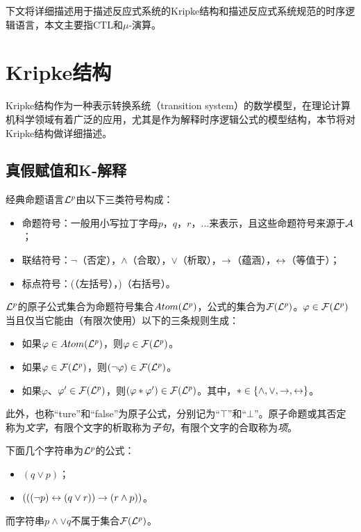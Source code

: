 下文将详细描述用于描述反应式系统的Kripke结构和描述反应式系统规范的时序逻辑语言，本文主要指CTL和$\mu$-演算。

\section{Kripke结构}
Kripke结构作为一种表示转换系统（transition system）的数学模型，在理论计算机科学领域有着广泛的应用，尤其是作为解释时序逻辑公式的模型结构，本节将对Kripke结构做详细描述。

\subsection{真假赋值和K-解释}
经典命题语言${\cal L}^p$由以下三类符号构成：
\begin{itemize}
	\item 命题符号：一般用小写拉丁字母$p$，$q$，$r$，$\dots$来表示，且这些命题符号来源于${\cal A}$；
	\item 联结符号：$\neg$（否定），$\wedge$（合取），$\vee$（析取），$\rightarrow$（蕴涵），$\leftrightarrow$（等值于）；
	\item 标点符号：(（左括号），)（右括号）。
\end{itemize}

${\cal L}^p$的原子公式集合为命题符号集合$Atom({\cal L}^p)$，公式的集合为${\cal F}({\cal L}^p)$。$\varphi\in {\cal F}({\cal L}^p)$当且仅当它能由（有限次使用）以下的三条规则生成\cite{luzhongwan1989}：
\begin{itemize}
	\item 如果$\varphi\in Atom({\cal L}^p)$，则$\varphi \in {\cal F}({\cal L}^p)$。
	\item 如果$\varphi \in {\cal F}({\cal L}^p)$，则$(\neg \varphi)\in {\cal F}({\cal L}^p)$。
	\item 如果$\varphi$、$\varphi'\in {\cal F}({\cal L}^p)$，则$(\varphi * \varphi')\in {\cal F}({\cal L}^p)$。其中，$*\in \{\wedge,\vee, \rightarrow, \leftrightarrow\}$。
\end{itemize}
此外，也称“ture”和“false”为原子公式，分别记为“$\top$”和“$\bot$”。原子命题或其否定称为\emph{文字}，有限个文字的析取称为\emph{子句}，有限个文字的合取称为\emph{项}。

\begin{example}\label{exp:pro:form}
	下面几个字符串为${\cal L}^p$的公式：
	\begin{itemize}
		\item $(q \vee p)$；
		\item $(((\neg p)\leftrightarrow(q\vee r))\rightarrow(r \wedge p))$。
	\end{itemize}
	而字符串$p\wedge \vee q$不属于集合${\cal F}({\cal L}^p)$。
\end{example}


